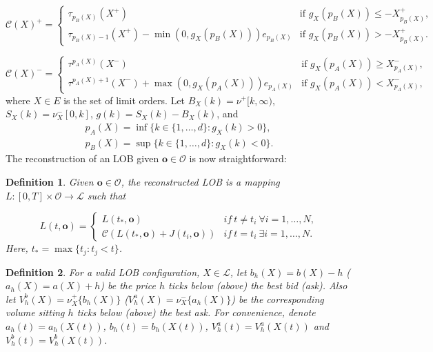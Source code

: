 \documentclass[10pt,a4paper,oneside]{article}
\newcommand{\Bo}{\mathcal{L}}
\newtheorem{definition}{Definition}
\begin{document}
\begin{equation*}
    \mathcal{C}(X)^+ = \begin{cases}
        \tau_{p_B(X)}(X^+)                                       & \text{if } g_X(p_B(X)) \leq - X^+_{p_B(X)}, \\
        \tau_{p_B(X) - 1}(X^+) - \min(0, g_X(p_B(X))) e_{p_B(X)} & \text{if } g_X(p_B(X)) > - X^+_{p_B(X)}.
    \end{cases}
\end{equation*}

\begin{equation*}
    \mathcal{C}(X)^- = \begin{cases}
        \tau^{p_A(X)}(X^-)                                       & \text{if } g_X(p_A(X)) \geq X^-_{p_A(X)}, \\
        \tau^{p_A(X) + 1}(X^-) + \max(0, g_X(p_A(X))) e_{p_A(X)} & \text{if } g_X(p_A(X)) <  X^-_{p_A(X)},
    \end{cases}
\end{equation*}
where $X \in E$ is the set of limit orders. Let $B_X(k) = \nu^+[k, \infty)$, $S_X(k) = \nu^-_X[0, k]$, $g(k) = S_X(k) - B_X(k)$, and
\begin{align*}
    p_A(X) = \inf \{ k \in \{1, \dots, d \} : g_X(k) > 0 \},\\
    p_B(X) = \sup \{ k \in \{1, \dots, d \} : g_X(k) < 0 \}.
\end{align*}
The reconstruction of an LOB given $\mathbf{o} \in  \mathcal{O}$ is now straightforward:

\begin{definition} Given $\mathbf{o} \in \mathcal{O}$, the reconstructed LOB is a mapping $L : [0, T] \times \mathcal{O} \rightarrow \Bo$ such that 

\begin{equation*}
    L(t, \mathbf{o}) =\begin{cases}
        L(t_*, \mathbf{o}) & if \ t \neq t_i\ \forall i = 1, \dots, N,\\
        \mathcal{C}\left( L(t_*, \mathbf{o}) + J(t_i, \mathbf{o}) \right) & if \ t = t_i \ \exists i = 1, \dots, N.
    \end{cases}
    \label{def:LOB_reconstructor}
\end{equation*}
Here, $t_* = \max\{t_j : t_j < t\}$.
\end{definition}

\begin{definition}
    For a valid LOB configuration, $X \in \mathcal{L}$, let $b_h(X) = b(X) - h$ ($a_h(X) = a(X) + h$) be the price $h$ ticks below (above) the best bid (ask).
     Also let $V^b_h(X) = \nu^+_{X}\{b_{h}(X)\}$ ($V^a_h(X) = \nu^-_{X}\{a_{h}(X)\}$) be the corresponding volume sitting $h$ ticks below (above) the best ask. For convenience, denote $a_h(t) = a_h(X(t))$, $b_h(t) = b_h(X(t))$, $V^a_h(t) = V^a_h(X(t))$ and $V^b_h(t) = V^b_h(X(t))$.
     \label{def:bid_ask_volume_dephts}
\end{definition}
\end{document}
